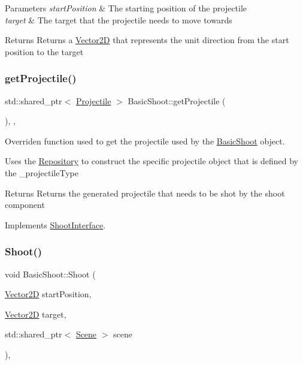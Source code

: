 \begin{DoxyParams}{Parameters}
{\em start\+Position} & The starting position of the projectile \\
\hline
{\em target} & The target that the projectile needs to move towards \\
\hline
\end{DoxyParams}
\begin{DoxyReturn}{Returns}
Returns a \hyperlink{class_vector2_d}{Vector2D} that represents the unit direction from the start position to the target 
\end{DoxyReturn}
\mbox{\label{class_basic_shoot_ab5058d147ca9d9cc4cc4210e9e092de5}} 
\subsubsection{\texorpdfstring{get\+Projectile()}{getProjectile()}}
{\footnotesize\ttfamily std\+::shared\+\_\+ptr$<$ \hyperlink{class_projectile}{Projectile} $>$ Basic\+Shoot\+::get\+Projectile (\begin{DoxyParamCaption}{ }\end{DoxyParamCaption})\hspace{0.3cm}{\ttfamily [override]}, {\ttfamily [protected]}, {\ttfamily [virtual]}}



Overriden function used to get the projectile used by the \hyperlink{class_basic_shoot}{Basic\+Shoot} object. 

Uses the \hyperlink{class_repository}{Repository} to construct the specific projectile object that is defined by the \+\_\+projectile\+Type \begin{DoxyReturn}{Returns}
Returns the generated projectile that needs to be shot by the shoot component 
\end{DoxyReturn}


Implements \hyperlink{class_shoot_interface_ad274b0c66a0a42bf194b32b704c8bfea}{Shoot\+Interface}.

\mbox{\label{class_basic_shoot_a8bed811408d1afa3ecf0454ae78f2303}} 
\subsubsection{\texorpdfstring{Shoot()}{Shoot()}}
{\footnotesize\ttfamily void Basic\+Shoot\+::\+Shoot (\begin{DoxyParamCaption}\item[{\hyperlink{class_vector2_d}{Vector2D}}]{start\+Position,  }\item[{\hyperlink{class_vector2_d}{Vector2D}}]{target,  }\item[{std\+::shared\+\_\+ptr$<$ \hyperlink{class_scene}{Scene} $>$}]{scene }\end{DoxyParamCaption})\hspace{0.3cm}{\ttfamily [override]}, {\ttfamily [virtual]}}



